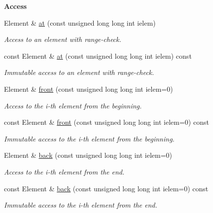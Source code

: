 \begin{Indent}{\bf Access}\par
\begin{DoxyCompactItemize}
\item 
Element \& \hyperlink{exceptionmagrathea_1_1SimpleHyperOctree_a34381e2085393ef475dcf66e180063c5}{at} (const unsigned long long int ielem)
\begin{DoxyCompactList}\small\item\em Access to an element with range-\/check. \end{DoxyCompactList}\item 
const Element \& \hyperlink{exceptionmagrathea_1_1SimpleHyperOctree_a4e2885288b4f881a1b1e527ddbda5d97}{at} (const unsigned long long int ielem) const 
\begin{DoxyCompactList}\small\item\em Immutable access to an element with range-\/check. \end{DoxyCompactList}\item 
Element \& \hyperlink{exceptionmagrathea_1_1SimpleHyperOctree_a456af04feaea7a3de5e331bec0692c04}{front} (const unsigned long long int ielem=0)
\begin{DoxyCompactList}\small\item\em Access to the i-\/th element from the beginning. \end{DoxyCompactList}\item 
const Element \& \hyperlink{exceptionmagrathea_1_1SimpleHyperOctree_a1fac5f615251f9ab11ab9532a3b7959a}{front} (const unsigned long long int ielem=0) const 
\begin{DoxyCompactList}\small\item\em Immutable access to the i-\/th element from the beginning. \end{DoxyCompactList}\item 
Element \& \hyperlink{exceptionmagrathea_1_1SimpleHyperOctree_a399a9ef8088f750ce1d86be811d14da1}{back} (const unsigned long long int ielem=0)
\begin{DoxyCompactList}\small\item\em Access to the i-\/th element from the end. \end{DoxyCompactList}\item 
const Element \& \hyperlink{exceptionmagrathea_1_1SimpleHyperOctree_acf867b94035502f8d1c233624ec2dcdf}{back} (const unsigned long long int ielem=0) const 
\begin{DoxyCompactList}\small\item\em Immutable access to the i-\/th element from the end. \end{DoxyCompactList}\item 

\end{DoxyCompactItemize}
\end{Indent}
